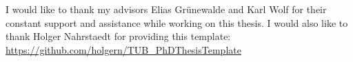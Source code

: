 

\begin{acknowledgements}      %

I would like to thank my advisors Elias Grünewalde and Karl Wolf for their constant support and assistance while working on this thesis. I would also like to thank Holger Nahrstaedt for providing this template: \url{https://github.com/holgern/TUB_PhDThesisTemplate}


\end{acknowledgements}



